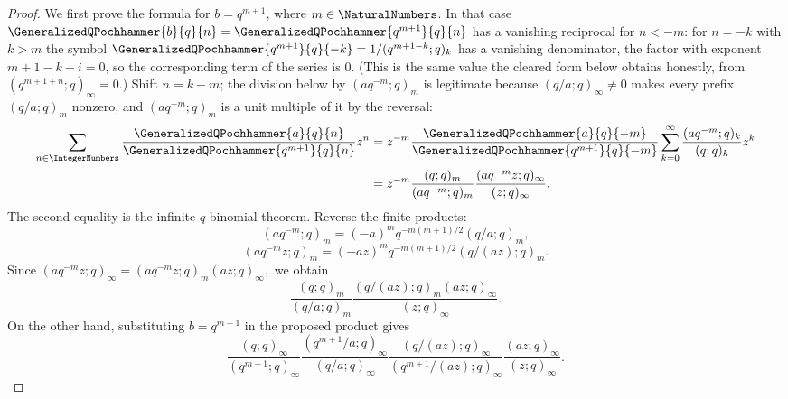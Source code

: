 \documentclass[11pt,a4paper,oneside,openany]{book}
\theoremstyle{definition}
\theoremstyle{remark}
\begin{document}
\begin{proof}
We first prove the formula for $b=q^{m+1}$, where $m\in\NaturalNumbers$.
In that case $\GeneralizedQPochhammer{b}{q}{n}=\GeneralizedQPochhammer{q^{m+1}}{q}{n}$ has a
vanishing reciprocal for $n<-m$: for $n=-k$ with $k>m$ the symbol
$\GeneralizedQPochhammer{q^{m+1}}{q}{-k}=1/(q^{m+1-k};q)_k$ has a vanishing denominator, the
factor with exponent $m+1-k+i=0$, so the corresponding term of the series is $0$.  (This is the
same value the cleared form below obtains honestly, from $(q^{m+1+n};q)_\infty=0$.)  Shift
$n=k-m$; the division below by $(aq^{-m};q)_m$ is legitimate because $(q/a;q)_\infty\ne0$ makes
every prefix $(q/a;q)_m$ nonzero, and $(aq^{-m};q)_m$ is a unit multiple of it by the reversal:
\begin{align*}
 \sum_{n\in\IntegerNumbers}
 \frac{\GeneralizedQPochhammer{a}{q}{n}}
      {\GeneralizedQPochhammer{q^{m+1}}{q}{n}}z^n
 &=z^{-m}\frac{\GeneralizedQPochhammer{a}{q}{-m}}
                  {\GeneralizedQPochhammer{q^{m+1}}{q}{-m}}
 \sum_{k=0}^{\infty}\frac{(aq^{-m};q)_k}{(q;q)_k}z^k\\
 &=z^{-m}\frac{(q;q)_m}{(aq^{-m};q)_m}
 \frac{(aq^{-m}z;q)_\infty}{(z;q)_\infty}.
\end{align*}
The second equality is the infinite $q$-binomial theorem.  Reverse the finite products:
\[
 (aq^{-m};q)_m=(-a)^mq^{-m(m+1)/2}(q/a;q)_m,
\]
\[
 (aq^{-m}z;q)_m=(-az)^mq^{-m(m+1)/2}(q/(az);q)_m.
\]
Since
\(
 (aq^{-m}z;q)_\infty=(aq^{-m}z;q)_m(az;q)_\infty,
\)
we obtain
\[
 \frac{(q;q)_m}{(q/a;q)_m}
 \frac{(q/(az);q)_m(az;q)_\infty}{(z;q)_\infty}.
\]
On the other hand, substituting $b=q^{m+1}$ in the proposed product gives
\[
 \frac{(q;q)_\infty}{(q^{m+1};q)_\infty}
 \frac{(q^{m+1}/a;q)_\infty}{(q/a;q)_\infty}
 \frac{(q/(az);q)_\infty}{(q^{m+1}/(az);q)_\infty}
 \frac{(az;q)_\infty}{(z;q)_\infty}.
\]


\end{proof}
\end{document}
